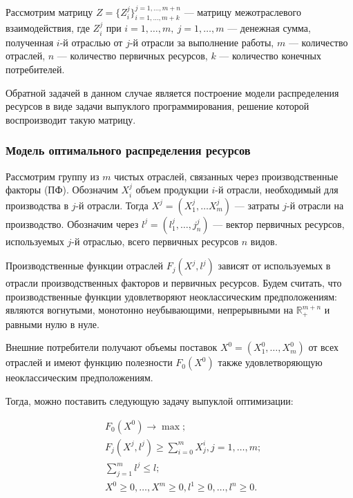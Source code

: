\documentclass[12pt, a4paper]{article}
\begin{document}
Рассмотрим матрицу $Z = \{Z^j_i\}_{i=1,\ldots,m+k}^{j=1,\ldots,m+n}$ --- матрицу межотраслевого взаимодействия, где $Z^j_i$ при $i = 1,\ldots,m,\ j=1,\ldots,m$ --- денежная сумма, полученная $i$-й отраслью от $j$-й отрасли за выполнение работы, $m$ --- количество отраслей, $n$ --- количество первичных ресурсов, $k$ --- количество конечных потребителей.

Обратной задачей в данном случае является построение модели распределения ресурсов в виде задачи выпуклого программирования, решение которой воспроизводит такую матрицу.

\subsubsection{Модель оптимального распределения ресурсов}
Рассмотрим группу из $m$ чистых отраслей, связанных через производственные факторы (ПФ). Обозначим $X_i^j$ объем  продукции $i$-й отрасли, необходимый для производства в $j$-й отрасли. Тогда $X^j = (X^j_1,\ldots X_m^j)$ --- затраты $j$-й отрасли на производство. Обозначим через $l^j = (l_1^j, \ldots , j_n^j)$ --- вектор первичных ресурсов, используемых $j$-й отраслью, всего первичных ресурсов $n$ видов.

Производственные функции отраслей $F_j(X^j, l^j)$ зависят от используемых в отрасли производственных факторов и первичных ресурсов. Будем считать, что производственные функции удовлетворяют неоклассическим предположениям: являются вогнутыми, монотонно неубывающими, непрерывными на $\mathbb{R}^{m+n}_+$ и равными нулю в нуле.

Внешние потребители получают объемы поставок $X^0 = (X_1^0,\ldots,X_m^0)$ от всех отраслей и имеют функцию полезности $F_0(X^0)$ также удовлетворяющую неоклассическим предположениям.

Тогда, можно поставить следующую задачу выпуклой оптимизации:

\begin{equation}\label{syst1}
\begin{aligned}
&F_0(X^0) \rightarrow \max;\\
&F_j(X^j, l^j) \geq \sum\limits_{i=0}^{m}X_j^i, j = 1,\ldots,m;\\
&\sum\limits_{j=1}^m l^j \leq l;\\
&X^0 \geq 0, \ldots, X^m \geq 0, l^1 \geq 0,\ldots,l^n \geq 0. 
\end{aligned}
\end{equation}
\end{document}
